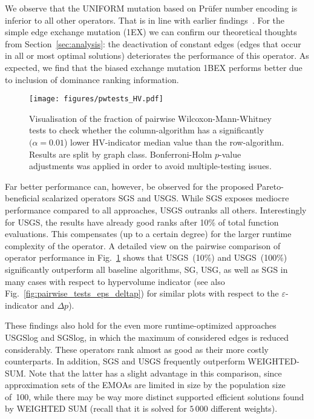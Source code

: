 \documentclass[twoside]{article}
\begin{document}
We observe that the UNIFORM mutation based on Pr\"ufer number encoding is inferior to all other operators. That is in line with earlier findings~\citep{Gottlieb2001,BG2017ParetoBeneficial}. For the simple edge exchange mutation (1EX) we can confirm our theoretical thoughts from Section~\ref{sec:analysis}: the deactivation of constant edges (edges that occur in all or most optimal solutions) deteriorates the performance of this operator. As expected, we find that the biased exchange mutation 1BEX performs better due to inclusion of dominance ranking information.

\begin{figure}[h!]
    \centering
    \texttt{[image: figures/pwtests\_HV.pdf]}
    \caption{Visualisation of the fraction of pairwise Wilcoxon-Mann-Whitney tests to check whether the column-algorithm has a significantly $(\alpha = 0.01$) lower HV-indicator median value than the row-algorithm. Results are split by graph class. Bonferroni-Holm $p$-value adjustments was applied in order to avoid multiple-testing issues.}
    \label{fig:pairwise_tests_HV}
\end{figure}
Far better performance can, however, be observed for the proposed Pareto-beneficial scalarized operators SGS and USGS. While SGS exposes mediocre performance compared to all approaches, USGS outranks all others. Interestingly for USGS, the results have already good ranks after 10\% of total function evaluations. This compensates (up to a certain degree) for the larger runtime complexity of the operator. 
A detailed view on the pairwise comparison of operator performance in Fig.~\ref{fig:pairwise_tests_HV} shows that USGS~(10\%) and USGS~(100\%) significantly outperform all baseline algorithms, SG, USG, as well as SGS in many cases with respect to hypervolume indicator (see also Fig.~\ref{fig:pairwise_tests_eps_deltap}) for similar plots with respect to the $\varepsilon$-indicator and $\Delta p$).

These findings also hold for the even more runtime-optimized approaches USGSlog and SGSlog, in which the maximum of considered edges is reduced considerably. These operators rank almost as good as their more costly counterparts. In addition, SGS and USGS frequently outperform WEIGHTED-SUM. Note that the latter has a slight advantage in this comparison, since approximation sets of the EMOAs are limited in size by the population size of~100, while there may be way more distinct supported efficient solutions found by WEIGHTED SUM (recall that it is solved for $5\,000$ different weights).
\end{document}
